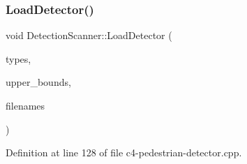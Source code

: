 \subsubsection{\texorpdfstring{Load\+Detector()}{LoadDetector()}}
{\footnotesize\ttfamily void Detection\+Scanner\+::\+Load\+Detector (\begin{DoxyParamCaption}\item[{std\+::vector$<$ \mbox{\hyperlink{class_node_detector_a7188c48dfe6b88b3b7f47c599c4832bd}{Node\+Detector\+::\+Node\+Type}} $>$ \&}]{types,  }\item[{std\+::vector$<$ int $>$ \&}]{upper\+\_\+bounds,  }\item[{std\+::vector$<$ std\+::string $>$ \&}]{filenames }\end{DoxyParamCaption})}



Definition at line 128 of file c4-\/pedestrian-\/detector.\+cpp.


